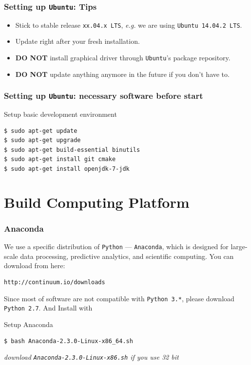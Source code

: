 \documentclass{beamer}
\newcommand{\ubuntu}{\texttt{Ubuntu}\xspace}
\newcommand{\ubuntults}{\texttt{Ubuntu 14.04.2 LTS}\xspace}
\begin{document}
\begin{frame}
\frametitle{Setting up \ubuntu: Tips}

\begin{itemize}
\item[\ding{80}] Stick to stable release \texttt{xx.04.x LTS}, \emph{e.g.} we are using \ubuntults.
\item[\ding{80}] Update right after your fresh installation.
\item[\ding{80}] \textbf{DO NOT} install graphical driver through \ubuntu's package repository.
\item[\ding{80}] \textbf{DO NOT} update anything anymore in the future if you don't have to. 
\end{itemize}

\end{frame}

\begin{frame}[fragile]

\frametitle{Setting up \ubuntu: necessary software before start}

\begin{block}{Setup basic development environment}
\begin{verbatim}
$ sudo apt-get update
$ sudo apt-get upgrade
$ sudo apt-get build-essential binutils
$ sudo apt-get install git cmake
$ sudo apt-get install openjdk-7-jdk
\end{verbatim}
\end{block}

\end{frame}

\section{Build Computing Platform}

\begin{frame}[fragile]
\frametitle{Anaconda}

We use a specific distribution of \texttt{Python} --- \texttt{Anaconda}, which is designed for large-scale data processing, predictive analytics, and scientific computing. You can download from here:
\begin{verbatim}
http://continuum.io/downloads
\end{verbatim}
Since most of software are not compatible with \texttt{Python 3.*}, please download \texttt{Python 2.7}. And Install with
\begin{block}{Setup Anaconda}
\begin{verbatim}
$ bash Anaconda-2.3.0-Linux-x86_64.sh
\end{verbatim}
\end{block}
\emph{download \texttt{Anaconda-2.3.0-Linux-x86.sh} if you use 32 bit}

\end{frame}
\end{document}
